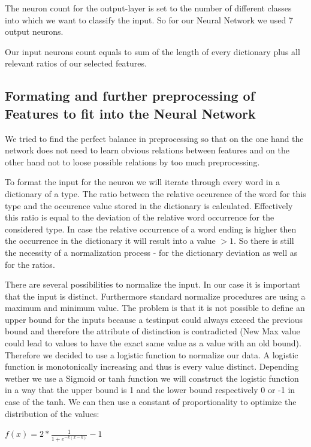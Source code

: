 \documentclass[paper=A4,pagesize=auto,12pt,headinclude=true,footinclude=true,BCOR=0mm,DIV=calc]{scrartcl}
\begin{document}
The neuron count for the output-layer is set to the number of different classes into which we want to classify the input. So for our Neural Network we used 7 output neurons.

Our input neurons count equals to sum of the length of every dictionary plus all relevant ratios of our selected features.

\subsection{Formating and further preprocessing of Features to fit into the Neural Network}
We tried to find the perfect balance in preprocessing so that on the one hand the network does not need to learn obvious relations between features and on the other hand not to loose possible relations by too much preprocessing.

To format the input for the neuron we will iterate through every word in a dictionary of a type. The ratio between the relative occurence of the word for this type and the occurence value stored in the dictionary is calculated. Effectively this ratio is equal to the deviation of the relative word occurrence for the considered type. In case the relative occurrence of a word ending is higher then the occurrence in the dictionary it will result into a value $> 1$. So there is still the necessity of a normalization process - for the dictionary deviation as well as for the ratios.

There are several possibilities to normalize the input. In our case it is important that the input is distinct. Furthermore standard normalize procedures are using a maximum and minimum value. The problem is that it is not possible to define an upper bound for the inputs because a testinput could always exceed the previous bound and therefore the attribute of distinction is contradicted (New Max value could lead to values to have the exact same value as a value with an old bound).
Therefore we decided to use a logistic function to normalize our data. A logistic function is monotonically increasing and thus is every value distinct. Depending wether we use a Sigmoid or tanh function we will construct the logistic function in a way that the upper bound is 1 and the lower bound respectively 0 or -1 in case of the tanh. 
We can then use a constant of proportionality to optimize the distribution of the values:

$f(x) = 2 * \frac{1}{1 + e^{-k(x-k)}} -1$
\end{document}
